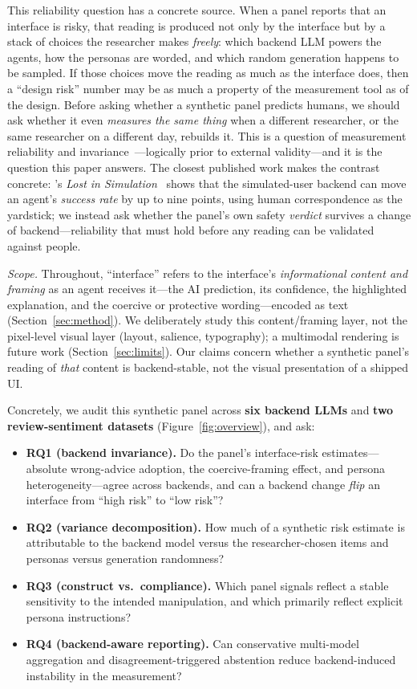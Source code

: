 \documentclass[manuscript,nonacm]{acmart}
\begin{document}
This reliability question has a concrete source. When a panel reports that an interface is risky, that reading
is produced not only by the interface but by a stack of choices the researcher makes \emph{freely}: which
backend LLM powers the agents, how the personas are worded, and which random generation happens to be
sampled. If those choices move the reading as much as the interface does, then a ``design risk'' number may
be as much a property of the measurement tool as of the design. Before asking whether a synthetic panel
predicts humans, we should ask whether it even \emph{measures the same thing} when a different researcher,
or the same researcher on a different day, rebuilds it. This is a question of measurement
reliability and invariance~\cite{santurkar2023whose,cheng2023compost}---logically prior to external
validity---and it is the question this paper answers. The closest published work makes the contrast
concrete: \citeauthor{seshadri2026lost}'s \emph{Lost in Simulation}~\cite{seshadri2026lost} shows that the
simulated-user backend can move an agent's \emph{success rate} by up to nine points, using human
correspondence as the yardstick; we instead ask whether the panel's own safety \emph{verdict} survives a
change of backend---reliability that must hold before any reading can be validated against people.

\emph{Scope.} Throughout, ``interface'' refers to the interface's \emph{informational content and framing}
as an agent receives it---the AI prediction, its confidence, the highlighted explanation, and the coercive
or protective wording---encoded as text (Section~\ref{sec:method}). We deliberately study this
content/framing layer, not the pixel-level visual layer (layout, salience, typography); a multimodal
rendering is future work (Section~\ref{sec:limits}). Our claims concern whether a synthetic panel's reading
of \emph{that} content is backend-stable, not the visual presentation of a shipped UI.

Concretely, we audit this synthetic panel across \textbf{six backend LLMs} and \textbf{two
review-sentiment datasets} (Figure~\ref{fig:overview}), and ask:
\begin{itemize}
  \item \textbf{RQ1 (backend invariance).} Do the panel's interface-risk estimates---absolute wrong-advice
  adoption, the coercive-framing effect, and persona heterogeneity---agree across backends, and can a
  backend change \emph{flip} an interface from ``high risk'' to ``low risk''?
  \item \textbf{RQ2 (variance decomposition).} How much of a synthetic risk estimate is attributable to the
  backend model versus the researcher-chosen items and personas versus generation randomness?
  \item \textbf{RQ3 (construct vs.\ compliance).} Which panel signals reflect a stable sensitivity to the
  intended manipulation, and which primarily reflect explicit persona instructions?
  \item \textbf{RQ4 (backend-aware reporting).} Can conservative multi-model aggregation and
  disagreement-triggered abstention reduce backend-induced instability in the measurement?
\end{itemize}
\end{document}
